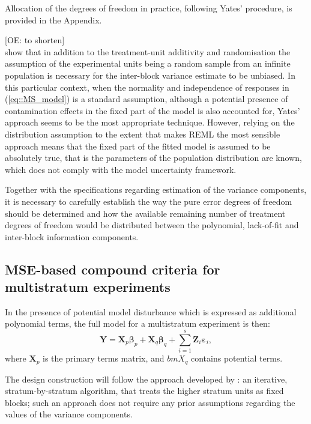 Allocation of the degrees of freedom in practice, following Yates' procedure, is provided in the Appendix. 

[OE: to shorten]\\
\cite{GilmourGoos2016Robust} show that in addition to the treatment-unit additivity and randomisation the assumption of the experimental units being a random sample from an infinite population is necessary for the inter-block variance estimate to be unbiased. In this particular context, when the normality and independence of responses in (\ref{eq::MS_model}) is a standard assumption, although a potential presence of contamination effects in the fixed part of the model is also accounted for, Yates' approach seems to be the most appropriate technique. However, relying on the distribution assumption to the extent that makes REML the most sensible approach means that the fixed part of the fitted model is assumed to be absolutely true, that is the parameters of the population distribution are known, which does not comply with the model uncertainty framework. 

Together with the specifications regarding estimation of the variance components, it is necessary to carefully establish the way the pure error degrees of freedom should be determined and how the available remaining number of treatment degrees of freedom would be distributed between the polynomial, lack-of-fit and inter-block information components. 

\subsection{MSE-based compound criteria for multistratum experiments}
\label{sec::ch7_search}
In the presence of potential model disturbance which is expressed as additional polynomial terms, the full model for a multistratum experiment is then:
\begin{equation}
\label{eq::MS_model_full}
\bm{Y}=\bm{X}_p\bm{\beta}_p+\bm{X}_q\bm{\beta}_q+\sum_{i=1}^{s}\bm{Z}_{i}\bm{\varepsilon}_{i},
\end{equation}
where $\bm{X}_p$ is the primary terms matrix, and $bm{X}_q$ contains potential terms.

The design construction will follow the approach developed by \cite{Trinca2015improved}: an iterative, stratum-by-stratum algorithm, that treats the higher stratum units as fixed blocks; such an approach does not require any prior assumptions regarding the values of the variance components. 

